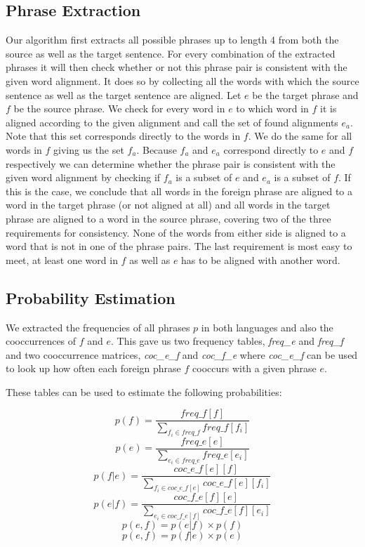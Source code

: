 \documentclass[11pt]{article}
\begin{document}
\subsection{Phrase Extraction}
\label{implem1}
Our algorithm first extracts all possible phrases up to length 4 from both the source as well as the target sentence. For every combination of the extracted phrases it will then check whether or not this phrase pair is consistent with the given word alignment. It does so by collecting all the words with which the source sentence as well as the target sentence are aligned. Let $e$ be the target phrase and $f$ be the source phrase. We check for every word in $e$ to which word in $f$ it is aligned according to the given alignment and call the set of found alignments $e_a$. Note that this set corresponds directly to the words in $f$. We do the same for all words in $f$ giving us the set $f_a$. Because $f_a$ and $e_a$ correspond directly to $e$ and $f$ respectively we can determine whether the phrase pair is consistent with the given word alignment by checking if $f_a$ is a subset of $e$ and $e_a$ is a subset of $f$. If this is the case, we conclude that all words in the foreign phrase are aligned to a word in the target phrase (or not aligned at all) and all words in the target phrase are aligned to a word in the source phrase, covering two of the three requirements for consistency. None of the words from either side is aligned to a word that is not in one of the phrase pairs. The last requirement is most easy to meet, at least one word in $f$ as well as $e$ has to be aligned with another word.

\subsection{Probability Estimation}
\label{implem2}
We extracted the frequencies of all phrases $p$ in both languages and also the cooccurrences of $f$ and $e$.
This gave us two frequency tables, \textit{freq\_e} and \textit{freq\_f} and two cooccurrence matrices, \textit{coc\_e\_f} and \textit{coc\_f\_e} where \textit{coc\_e\_f} can be used to look up how often each foreign phrase $f$ cooccurs with a given phrase $e$. 

These tables can be used to estimate the following probabilities:

$$ p(f) = \frac{freq\_f[f] }{  \sum_{f_i \in freq\_f} freq\_f[f_i]  } $$
$$ p(e) = \frac{freq\_e[e] }{  \sum_{e_i \in freq\_e} freq\_e[e_i]  } $$
$$ p(f|e) = \frac{coc\_e\_f[e][f]}{ \sum_{f_i \in coc\_e\_f[e]}  coc\_e\_f[e][f_i]} $$
$$ p(e|f) = \frac{coc\_f\_e[f][e]}{ \sum_{e_i \in coc\_f\_e[f]}  coc\_f\_e[f][e_i]} $$
$$ p(e, f) = p(e|f) \times p(f) $$
$$ p(e, f) = p(f|e) \times p(e) $$
\end{document}

